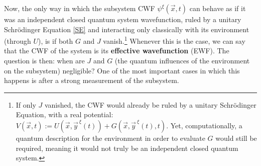 \documentclass[11pt, a4paper]{article} %
\begin{document}


Now, the only way in which the subsystem CWF $\psi^\xi(\vec{x},t)$ can behave as if it was an independent closed quantum system wavefunction, ruled by a unitary Schrödinger Equation \eqref{SE} and interacting only classically with its environment (through $U$), is if both $G$ and $J$ vanish.\footnote{ If only $J$ vanished, the CWF would already be ruled by a unitary Schrödinger Equation, with a real potential: $V(\vec{x},t):=U(\vec{x},\vec{y}^{\:\xi}(t))+G(\vec{x},\vec{y}^{\:\xi}(t),t)$. Yet, computationally, a quantum description for the environment in order to evaluate $G$ would still be required, meaning it would not truly be an independent closed quantum system. } Whenever this is the case, we can say that the CWF of the system is its {\bf effective wavefunction} (EWF). The question is then: when are $J$ and $G$ (the quantum influences of the environment on the subsystem) negligible? One of the most important cases in which this happens is after a strong measurement of the subsystem. 


\end{document}
